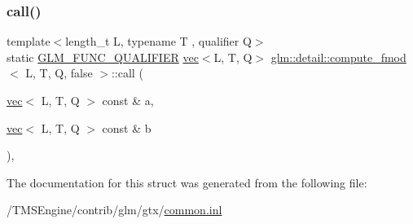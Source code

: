 \subsubsection{\texorpdfstring{call()}{call()}}
{\footnotesize\ttfamily template$<$length\+\_\+t L, typename T , qualifier Q$>$ \\
static \hyperlink{setup_8hpp_a33fdea6f91c5f834105f7415e2a64407}{G\+L\+M\+\_\+\+F\+U\+N\+C\+\_\+\+Q\+U\+A\+L\+I\+F\+I\+ER} \hyperlink{structglm_1_1vec}{vec}$<$L, T, Q$>$ \hyperlink{structglm_1_1detail_1_1compute__fmod}{glm\+::detail\+::compute\+\_\+fmod}$<$ L, T, Q, false $>$\+::call (\begin{DoxyParamCaption}\item[{\hyperlink{structglm_1_1vec}{vec}$<$ L, T, Q $>$ const \&}]{a,  }\item[{\hyperlink{structglm_1_1vec}{vec}$<$ L, T, Q $>$ const \&}]{b }\end{DoxyParamCaption})\hspace{0.3cm}{\ttfamily [inline]}, {\ttfamily [static]}}



The documentation for this struct was generated from the following file\+:\begin{DoxyCompactItemize}
\item 
/\+T\+M\+S\+Engine/contrib/glm/gtx/\hyperlink{common_8inl}{common.\+inl}\end{DoxyCompactItemize}

